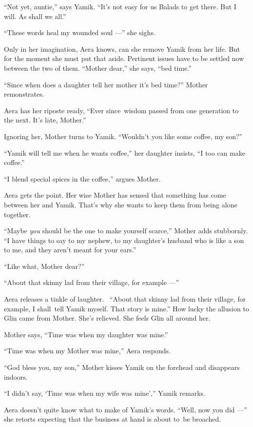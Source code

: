 \documentclass[twoside,11pt,openany]{book}
\begin{document}
{}``Not yet, auntie,'' says Yamik. ``It's not easy for us Balads to get there. But I will. As shall we all.''

{}``These words heal my wounded soul ---'' she sighs.

Only in her imagination, Aera knows, can she remove Yamik from her life. But for the moment she must put that aside.
Pertinent issues have to be settled now between the two of them. ``Mother dear,'' she says, ``bed time.''

{}``Since when does a daughter tell her mother it's bed time?''  Mother remonstrates.

Aera has her riposte ready, ``Ever since~wisdom passed from one generation to the next. It's late, Mother.''

Ignoring her, Mother turns to Yamik. {}``Wouldn't you like some coffee, my son?''

``Yamik will tell me when he wants coffee,'' her daughter insists, ``I too can make
coffee.''

{}``I blend special spices in the coffee,'' argues Mother.

Aera gets the point. Her wise Mother has sensed that something has come between her and Yamik. That's why she wants to
keep them from being alone together.

{}``Maybe \textit{you} should be the one to make yourself scarce,'' Mother adds stubbornly. ``I have things to say to my
nephew, to my daughter's husband who is like a son to me, and they aren't meant for your ears.''

{}``Like what, Mother dear?''

{}``About that skinny{ }lad from their village, for example ---''

Aera releases a tinkle of laughter. ~``About that skinny lad from their village, for example, I shall~tell Yamik
myself. That story is mine.'' How lucky the allusion to Glin came from Mother. She's relieved. She feels Glin all
around her.

Mother says, ``Time was when my daughter was mine.''

 ``Time was when my Mother was mine,{}'' Aera responds.

``God bless you, my son,'' Mother kisses Yamik on the forehead and disappears indoors.

``I didn't say, `Time was when my wife was mine','' Yamik remarks.

Aera doesn't quite know what to make of Yamik's words.
``Well, now you did ---'' she retorts expecting that the business at hand is about to~be broached.
\end{document}
